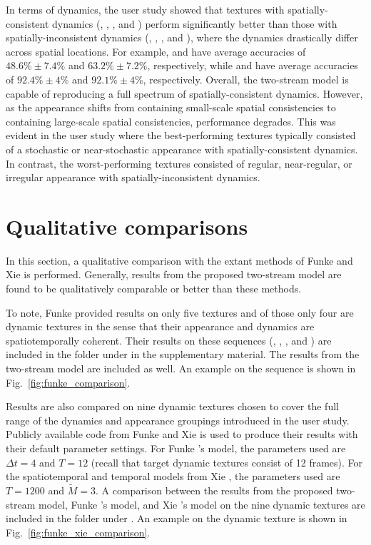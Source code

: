 In terms of dynamics, the user study showed that textures with
spatially-consistent dynamics (\eg, , 
, and  ) perform 
significantly better than those with spatially-inconsistent 
dynamics (\eg, , , 
and ), where the dynamics drastically differ 
across spatial locations.
For example,  and 
have average accuracies of $48.6\% \pm 7.4\%$ and
$63.2\% \pm 7.2\%$, respectively, while
 and  have average 
accuracies of $92.4\% \pm 4\%$ and $92.1\% \pm 4\%$, 
respectively.
Overall, the two-stream model is capable of reproducing a full spectrum
of spatially-consistent dynamics.
However, as the appearance shifts from containing small-scale 
spatial consistencies to containing large-scale spatial consistencies,
performance degrades.
This was evident in the user study where the best-performing 
textures typically consisted of a stochastic or
near-stochastic appearance with spatially-consistent 
dynamics.
In contrast, the worst-performing textures consisted of
regular, near-regular, or irregular appearance with
spatially-inconsistent dynamics.

\section{Qualitative comparisons}

In this section, a qualitative comparison with the extant methods of Funke 
\etal \cite{funke2017} and Xie \etal \cite{xie2017synthesizing} is performed.
Generally, results from the proposed two-stream model are found to be qualitatively comparable or better than these methods.

To note, Funke \etal provided results on
only five textures and of those only four
are dynamic textures in the sense that their appearance
and dynamics are spatiotemporally coherent.
Their results on these sequences (, , 
, and ) are included in the folder
 under  in the supplementary material. The results from the two-stream model are included as well. An example on the  sequence is shown in Fig.\ \ref{fig:funke_comparison}.



Results are also compared on nine dynamic textures chosen to cover the full
range of the dynamics and appearance groupings introduced in the user study.
Publicly available code from Funke \etal and Xie \etal is used to produce their
results with their default parameter settings. For
Funke \etal's model, the parameters used are $\Delta{t}=4$ and
$T=12$ (recall that target dynamic textures
consist of 12 frames). For the spatiotemporal and temporal models from Xie
\etal, the parameters used are $T=1200$ and
$\tilde{M}=3$.
A comparison between the results from the proposed two-stream model, Funke
\etal's model, and Xie \etal's model
on the nine dynamic textures are included in the folder 
under . An example on the  dynamic texture is shown in Fig.\ \ref{fig:funke_xie_comparison}.

